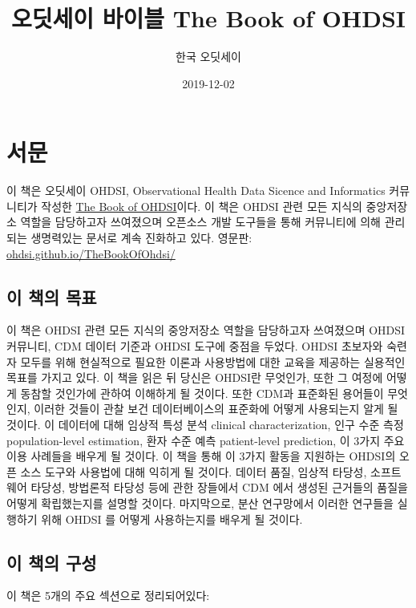 \documentclass[10.5pt]{book}
\title{오딧세이 바이블 The Book of OHDSI}
\author{한국 오딧세이}
\date{2019-12-02}
\theoremstyle{definition}
\theoremstyle{definition}
\theoremstyle{definition}
\theoremstyle{remark}
\begin{document}
\maketitle

{
\setcounter{tocdepth}{1}
\tableofcontents
}
\chapter*{서문}

 이 책은 오딧세이 OHDSI, Observational Health Data Sicence and
Informatics 커뮤니티가 작성한 \href{book.ohdsi.org}{The Book of
OHDSI}이다. 이 책은 OHDSI 관련 모든 지식의 중앙저장소 역할을 담당하고자
쓰여졌으며 오픈소스 개발 도구들을 통해 커뮤니티에 의해 관리되는
생명력있는 문서로 계속 진화하고 있다. 영문판:
\href{https://github.com/OHDSI/TheBookOfOhdsi}{ohdsi.github.io/TheBookOfOhdsi/}

\section*{이 책의 목표}\label{--}

이 책은 OHDSI 관련 모든 지식의 중앙저장소 역할을 담당하고자 쓰여졌으며
OHDSI 커뮤니티, CDM 데이터 기준과 OHDSI 도구에 중점을 두었다. OHDSI
초보자와 숙련자 모두를 위해 현실적으로 필요한 이론과 사용방법에 대한
교육을 제공하는 실용적인 목표를 가지고 있다. 이 책을 읽은 뒤 당신은
OHDSI란 무엇인가, 또한 그 여정에 어떻게 동참할 것인가에 관하여 이해하게
될 것이다. 또한 CDM과 표준화된 용어들이 무엇인지, 이러한 것들이 관찰
보건 데이터베이스의 표준화에 어떻게 사용되는지 알게 될 것이다. 이
데이터에 대해 임상적 특성 분석 clinical characterization, 인구 수준 측정
population-level estimation, 환자 수준 예측 patient-level prediction, 이
3가지 주요 이용 사례들을 배우게 될 것이다. 이 책을 통해 이 3가지 활동을
지원하는 OHDSI의 오픈 소스 도구와 사용법에 대해 익히게 될 것이다. 데이터
품질, 임상적 타당성, 소프트웨어 타당성, 방법론적 타당성 등에 관한
장들에서 CDM 에서 생성된 근거들의 품질을 어떻게 확립했는지를 설명할
것이다. 마지막으로, 분산 연구망에서 이러한 연구들을 실행하기 위해 OHDSI
를 어떻게 사용하는지를 배우게 될 것이다.

\section*{이 책의 구성}\label{--}

이 책은 5개의 주요 섹션으로 정리되어있다:
\end{document}
